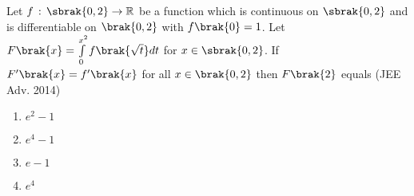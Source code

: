 \item
Let $f\,:\,\sbrak{0,2}\to\mathbb{R}$ be a function which is continuous on $\sbrak{0,2}$ and is differentiable on $\brak{0,2}$ with $f\brak{0}=1$. Let $F\brak{x}=\int \limits_{0}^{x^{2}}f\brak{\sqrt{t}}dt$ for $x\in\sbrak{0,2}$. If $F^{\prime}\brak{x}=f^{\prime}\brak{x}$ for all ${x\in\brak{0,2}}$ then $F\brak{2}$ equals \hfill{(JEE Adv. 2014)}

\begin{multicols}{2}
\begin{enumerate}
\item$e^{2}-1$
\item$e^{4}-1$
\item$e-1$
\item$e^{4}$
\end{enumerate} 
\end{multicols}
